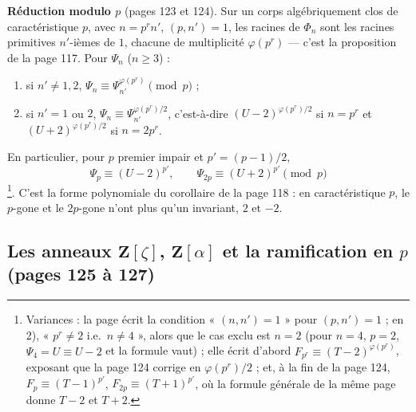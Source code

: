 \documentclass[11pt,a4paper]{article}
\begin{document}
\textbf{Réduction modulo $p$} (pages 123 et 124). Sur un corps algébriquement
clos de caractéristique $p$, avec $n = p^r n'$, $(p, n') = 1$, les racines de
$\Phi_n$ sont les racines primitives $n'$-ièmes de $1$, chacune de
multiplicité $\varphi(p^r)$ --- c'est la proposition de la page 117. Pour
$\Psi_n$ ($n \geq 3$) :
\begin{enumerate}
  \item[1)] si $n' \neq 1, 2$, $\Psi_n \equiv \Psi_{n'}^{\varphi(p^r)} \pmod
    p$ ;
  \item[2)] si $n' = 1$ ou $2$, $\Psi_n \equiv \Psi_{n'}^{\varphi(p^r)/2}$,
    c'est-à-dire $(U - 2)^{\varphi(p^r)/2}$ si $n = p^r$ et $(U +
    2)^{\varphi(p^r)/2}$ si $n = 2p^r$.
\end{enumerate}
En particulier, pour $p$ premier impair et $p' = (p - 1)/2$,
\[
  \Psi_p \equiv (U - 2)^{p'}, \qquad \Psi_{2p} \equiv (U + 2)^{p'} \pmod p
\]
\footnote{Variances : la page écrit la condition « $(n, n') = 1$ » pour $(p,
n') = 1$ ; en 2), « $p^r \neq 2$ i.e.\ $n \neq 4$ », alors que le cas exclu est
$n = 2$ (pour $n = 4$, $p = 2$, $\Psi_4 = U \equiv U - 2$ et la formule vaut) ;
elle écrit d'abord $F_{p^r} \equiv (T - 2)^{\varphi(p^r)}$, exposant que la
page 124 corrige en $\varphi(p^r)/2$ ; et, à la fin de la page 124, $F_p
\equiv (T - 1)^{p'}$, $F_{2p} \equiv (T + 1)^{p'}$, où la formule générale de
la même page donne $T - 2$ et $T + 2$.}. C'est la forme polynomiale du
corollaire de la page 118 : en caractéristique $p$, le $p$-gone et le
$2p$-gone n'ont plus qu'un invariant, $2$ et $-2$.

\subsection*{Les anneaux $\mathbf{Z}[\zeta]$, $\mathbf{Z}[\alpha]$ et la ramification en $p$ (pages 125 à 127)}
\end{document}
